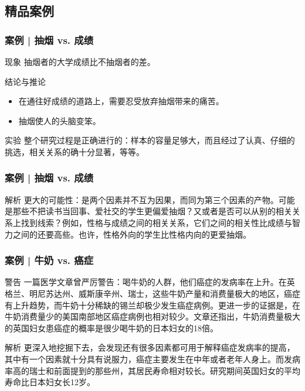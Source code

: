 \subsection{精品案例}
\begin{frame}
  \frametitle{案例 | 抽烟 vs. 成绩}
  \begin{block}{现象}
    抽烟者的大学成绩比不抽烟者的差。
  \end{block}
  \pause
  \begin{block}{结论与推论}
    \begin{itemize}
      \item 在通往好成绩的道路上，需要忍受放弃抽烟带来的痛苦。
      \item 抽烟使人的头脑变笨。
    \end{itemize}
  \end{block}
  \pause
  \begin{block}{实验}
    整个研究过程是正确进行的：样本的容量足够大，而且经过了认真、仔细的挑选，相关关系的确十分显著，等等。
  \end{block}
\end{frame}

\begin{frame}
  \frametitle{案例 | 抽烟 vs. 成绩}
  \begin{block}{解析}
    更大的可能性：是两个因素并不互为因果，而同为第三个因素的产物。可能是那些不把读书当回事、爱社交的学生更偏爱抽烟？又或者是否可以从别的相关关系上找到线索？例如，性格与成绩之间的相关关系，它们之间的相关性比成绩与智力之间的还要高些。也许，性格外向的学生比性格内向的更爱抽烟。
  \end{block}
\end{frame}

\begin{frame}
  \frametitle{案例 | 牛奶 vs. 癌症}
  \begin{block}{警告}
    一篇医学文章曾严厉警告：喝牛奶的人群，他们癌症的发病率在上升。在英格兰、明尼苏达州、威斯康辛州、瑞士，这些牛奶产量和消费量极大的地区，癌症有上升趋势，而牛奶十分稀缺的锡兰却极少发生癌症病例。更进一步的证据是，在牛奶消费量少的美国南部地区癌症病例也相对较少。文章还指出，牛奶消费量极大的英国妇女患癌症的概率是很少喝牛奶的日本妇女的18倍。
  \end{block}
  \pause \pause \pause \pause
  \begin{block}{解析}
更深入地挖掘下去，会发现还有很多因素都可用于解释癌症发病率的提高，其中有一个因素就十分具有说服力，癌症主要发生在中年或者老年人身上。而发病率高的瑞士和前面提到的那些州，其居民寿命相对较长。研究期间英国妇女的平均寿命比日本妇女长12岁。
  \end{block}
\end{frame}

